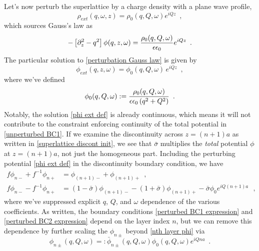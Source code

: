 \documentclass{article}
\begin{document}
Let's now perturb the superlattice by a charge density with a plane wave profile,
\begin{equation}
    \label{rho ext}
    \rho_{ext}(q,\omega,z) = \rho_0(q,Q,\omega) e^{i Q z}
    \,\,\,,
\end{equation}
which sources Gauss's law as
\begin{equation}
    \label{perturbation Gauss law}
    -\left[\partial_z^2-q^2\right]\phi(q,z,\omega) = \frac{\rho_0(q,Q,\omega)}{\epsilon\epsilon_0} e^{i Q z}
    \,\,\,.
\end{equation}
The particular solution to \eqref{perturbation Gauss law} is given by
\begin{equation}
    \label{phi ext def}
    \phi_{ext}(q,z,\omega) = \phi_0(q,Q,\omega)\, e^{i Q z}
    \,\,\,,
\end{equation}
where we've defined
\begin{equation}
    \label{phi0 def}
    \phi_0(q,Q,\omega) := \frac{\rho_0(q,Q,\omega)}{\epsilon\epsilon_0\left( q^2+Q^2\right)}
    \,\,\,.
\end{equation}
Notably, the solution \eqref{phi ext def} is already continuous, which means it will not contribute to the constraint enforcing continuity of the total potential in \eqref{unperturbed BC1}.  If we examine the discontinuity across $z=(n+1)a$ as written in \eqref{superlattice discont init}, we see that $\bar\sigma$ multiplies the {\it total} potential $\phi$ at $z=(n+1)a$, not just the homogeneous part.  Including the perturbing potential \eqref{phi ext def} in the discontinuity boundary condition, we have
\begin{align}
    \label{perturbed BC1 expression}
    f \phi_{n-} + f^{-1}\phi_{n+} &= \phi_{(n+1)-} + \phi_{(n+1)+}
    \,\,\,,
    \\
    \label{perturbed BC2 expression}
    f \phi_{n-} - f^{-1}\phi_{n+} &= (1-\bar\sigma)\phi_{(n+1)-}-(1+\bar\sigma)\phi_{(n+1)+} - \bar\sigma \phi_0 e^{i Q(n+1)a}
    \,\,\,\,,
\end{align}
where we've suppressed explicit $q$, $Q$, and $\omega$ dependence of the various coefficients.  As written, the boundary conditions \eqref{perturbed BC1 expression} and \eqref{perturbed BC2 expression} depend on the layer index $n$, but we can remove this dependence by further scaling the $\phi_{n\pm}$ beyond \eqref{nth layer phi} via
\begin{equation}
    \label{Q scaled phi pm}
    \phi_{n\pm}(q,Q,\omega) =: \bar\phi_{n\pm}(q,Q,\omega) \phi_0(q,Q,\omega) e^{i Q n a}
    \,\,\,.
\end{equation}
\end{document}
